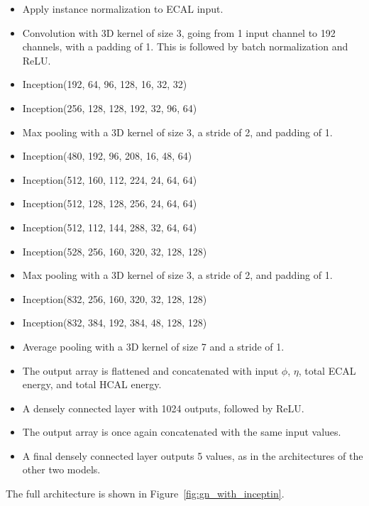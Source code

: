 \begin{itemize}
    \item Apply instance normalization to ECAL input.
    \item Convolution with 3D kernel of size 3, going from 1 input channel to 192 channels, with a padding of 1. This is followed by batch normalization and ReLU.
    \item Inception(192,  64,  96, 128, 16, 32, 32)
    \item Inception(256, 128, 128, 192, 32, 96, 64)
    \item Max pooling with a 3D kernel of size 3, a stride of 2, and padding of 1.
    \item Inception(480, 192,  96, 208, 16,  48,  64)
    \item Inception(512, 160, 112, 224, 24,  64,  64)
    \item Inception(512, 128, 128, 256, 24,  64,  64)
    \item Inception(512, 112, 144, 288, 32,  64,  64)
    \item Inception(528, 256, 160, 320, 32, 128, 128)
    \item Max pooling with a 3D kernel of size 3, a stride of 2, and padding of 1.
    \item Inception(832, 256, 160, 320, 32, 128, 128)
    \item Inception(832, 384, 192, 384, 48, 128, 128)
    \item Average pooling with a 3D kernel of size 7 and a stride of 1.
    \item The output array is flattened and concatenated with input $\phi$, $\eta$, total ECAL energy, and total HCAL energy.
    \item A densely connected layer with 1024 outputs, followed by ReLU.
    \item The output array is once again concatenated with the same input values.
    \item A final densely connected layer outputs 5 values, as in the architectures of the other two models.
\end{itemize}

The full architecture is shown in Figure~\ref{fig:gn_with_inceptin}.

